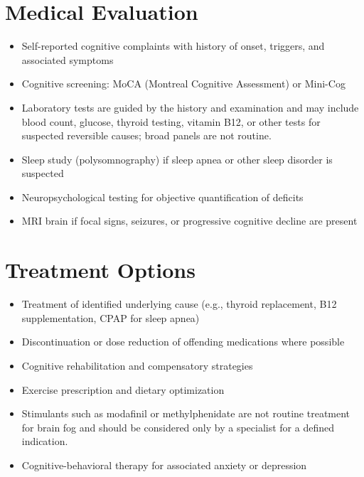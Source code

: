 \section*{Medical Evaluation}
\begin{itemize}
 \item Self-reported cognitive complaints with history of onset, triggers, and associated symptoms
 \item Cognitive screening: MoCA (Montreal Cognitive Assessment) or Mini-Cog
 \item Laboratory tests are guided by the history and examination and may include blood count, glucose, thyroid testing, vitamin B12, or other tests for suspected reversible causes; broad panels are not routine.
 \item Sleep study (polysomnography) if sleep apnea or other sleep disorder is suspected
 \item Neuropsychological testing for objective quantification of deficits
 \item MRI brain if focal signs, seizures, or progressive cognitive decline are present
\end{itemize}

\section*{Treatment Options}
\begin{itemize}
 \item Treatment of identified underlying cause (e.g., thyroid replacement, B12 supplementation, CPAP for sleep apnea)
 \item Discontinuation or dose reduction of offending medications where possible
 \item Cognitive rehabilitation and compensatory strategies
 \item Exercise prescription and dietary optimization
 \item Stimulants such as modafinil or methylphenidate are not routine treatment for brain fog and should be considered only by a specialist for a defined indication.
 \item Cognitive-behavioral therapy for associated anxiety or depression
\end{itemize}

